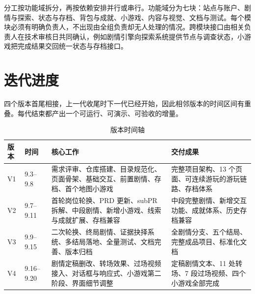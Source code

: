 分工按功能域拆分，再按依赖安排并行或串行。功能域分为七块：站点与账户、剧情与探索、状态与存档、背包与成就、小游戏、内容与视觉、文档与测试。每个模块必须有明确负责人，不出现由全组负责却无人处理的情况。跨模块接口由相关负责人在技术审核日共同确认，例如剧情引擎向探索系统提供节点与调查状态，小游戏把完成结果交回统一状态与存档接口。

\section{迭代进度}

四个版本首尾相接，上一代收尾时下一代已经开始，因此相邻版本的时间区间有重叠。每代结束都产出一个可运行、可演示、可验收的增量。

\begin{table}[htbp]
\centering
\caption{版本时间轴}
\small
\begin{tabularx}{\linewidth}{@{}l l X X@{}}
\toprule
版本 & 时间 & 核心工作 & 交付成果 \\
\midrule
V1 & 9.3--9.8 & 需求评审、仓库搭建、目录规范化、页面骨架、基础交互、前置剧情、存档、首个地图小游戏 & 完整项目架构、13 个页面、可连续游玩的游玩链路、存档体系 \\
V2 & 9.7--9.11 & 首轮岗位轮换、PRD 更新、subPR 拆解、中段剧情、新增小游戏、线索与成就扩展、存档兼容 & 中段完整剧情、新增交互功能、成就体系、历史存档兼容 \\
V3 & 9.9--9.15 & 二次轮换、终局剧情、证据抉择系统、多结局落地、全量测试、文档完善、版本归档 & 全剧情分支、五个结局、完整成品项目、标准化文档 \\
V4 & 9.16--9.20 & 剧情定稿删改、转场效果、过场视频接入、对话框与响应式、小游戏第二阶段、界面细节调整 & 定稿剧情文本、11 处转场、7 段过场视频、四个小游戏全部完成 \\
\bottomrule
\end{tabularx}
\end{table}

